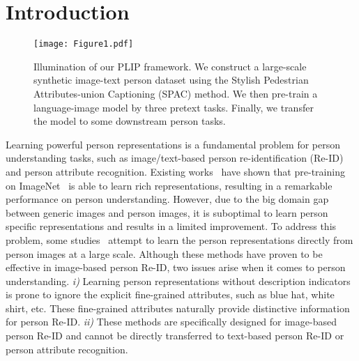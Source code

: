 \documentclass[10pt,twocolumn,letterpaper]{article}
\def\etc{{etc}}
\begin{document}
\section{Introduction}
\begin{figure} \label{fig1}
    \centering \texttt{[image: Figure1.pdf]}
    \caption{Illumination of our PLIP framework. We construct a large-scale synthetic image-text person dataset using the Stylish Pedestrian Attributes-union Captioning (SPAC) method. We then pre-train a language-image model by three pretext tasks. Finally, we transfer the model to some downstream person tasks.
    }
\end{figure}

Learning powerful person representations is a fundamental problem for person understanding tasks, such as image/text-based person re-identification (Re-ID) and person attribute recognition. Existing works~\cite{MGN,ABDNet,LGUR,tipcb} have shown that pre-training on ImageNet~\cite{imagenet} is able to learn rich representations, resulting in a remarkable performance on person understanding. However, due to the big domain gap between generic images and person images, it is suboptimal to learn person specific representations and results in a limited improvement. To address this problem, some studies~\cite{LUP,LUPnl} attempt to learn the person representations directly from person images at a large scale. Although these methods have proven to be effective in image-based person Re-ID, two issues arise when it comes to person understanding.
\textit{i)} Learning person representations without description indicators is prone to ignore the explicit fine-grained attributes, such as blue hat, white shirt, \etc. These fine-grained attributes naturally provide distinctive information for person Re-ID. \textit{ii)} These methods are specifically designed for image-based person Re-ID and cannot be directly transferred to text-based person Re-ID or person attribute recognition.
\end{document}
